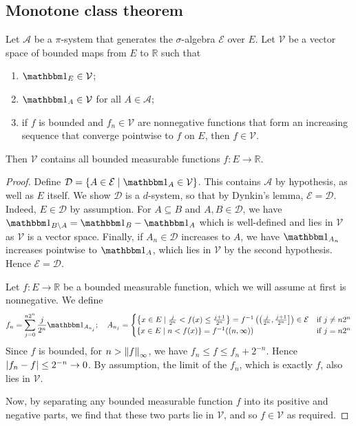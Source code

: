 \subsection{Monotone class theorem}
\begin{theorem}
	Let \( \mathcal A \) be a \( \pi \)-system that generates the \( \sigma \)-algebra \( \mathcal E \) over \( E \).
	Let \( \mathcal V \) be a vector space of bounded maps from \( E \) to \( \mathbb R \) such that
	\begin{enumerate}
		\item \( \mathbbm 1_E \in \mathcal V \);
		\item \( \mathbbm 1_A \in \mathcal V \) for all \( A \in \mathcal A \);
		\item if \( f \) is bounded and \( f_n \in \mathcal V \) are nonnegative functions that form an increasing sequence that converge pointwise to \( f \) on \( E \), then \( f \in \mathcal V \).
	\end{enumerate}
	Then \( \mathcal V \) contains all bounded measurable functions \( f \colon E \to \mathbb R \).
\end{theorem}
\begin{proof}
	Define \( \mathcal D = \qty{A \in \mathcal E \mid \mathbbm 1_A \in \mathcal V} \).
	This contains \( \mathcal A \) by hypothesis, as well as \( E \) itself.
	We show \( \mathcal D \) is a \( d \)-system, so that by Dynkin's lemma, \( \mathcal E = \mathcal D \).
	Indeed, \( E \in \mathcal D \) by assumption.
	For \( A \subseteq B \) and \( A, B \in \mathcal D \), we have \( \mathbbm 1_{B \setminus A} = \mathbbm 1_B - \mathbbm 1_A \) which is well-defined and lies in \( \mathcal V \) as \( \mathcal V \) is a vector space.
	Finally, if \( A_n \in \mathcal D \) increases to \( A \), we have \( \mathbbm 1_{A_n} \) increases pointwise to \( \mathbbm 1_A \), which lies in \( \mathcal V \) by the second hypothesis.
	Hence \( \mathcal E = \mathcal D \).

	Let \( f \colon E \to \mathbb R \) be a bounded measurable function, which we will assume at first is nonnegative.
	We define
	\[ f_n = \sum_{j=0}^{n2^n} \frac{j}{2^n} \mathbbm 1_{A_{n_j}};\quad A_{n_j} = \begin{cases}
		\qty{x \in E \mid \frac{j}{2^n} < f(x) \leq \frac{j+1}{2^n}} = f^{-1}\left(\left(\frac{j}{2^n}, \frac{j+1}{2^n}\right]\right) \in \mathcal E & \text{if } j \neq n2^n \\
		\qty{x \in E \mid n < f(x)} = f^{-1}((n,\infty)) & \text{if } j = n2^n
	\end{cases} \]
	Since \( f \) is bounded, for \( n > \norm{f}_{\infty} \), we have \( f_n \leq f \leq f_n + 2^{-n} \).
	Hence \( \abs{f_n - f} \leq 2^{-n} \to 0 \).
	By assumption, the limit of the \( f_n \), which is exactly \( f \), also lies in \( \mathcal V \).

	Now, by separating any bounded measurable function \( f \) into its positive and negative parts, we find that these two parts lie in \( \mathcal V \), and so \( f \in \mathcal V \) as required.
\end{proof}

